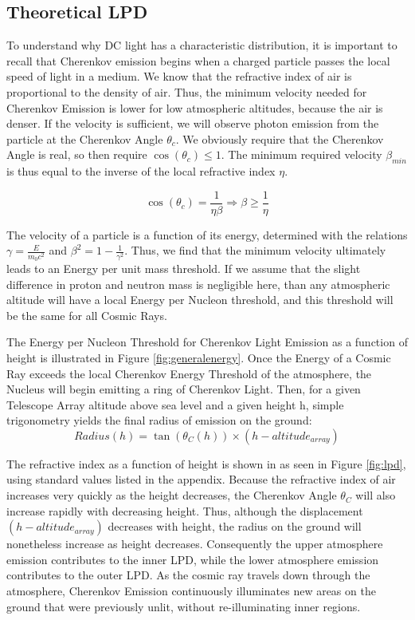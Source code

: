 \documentclass[11pt]{article}
\begin{document}
\subsection{Theoretical LPD}
To understand why DC light has a characteristic distribution, it is important to recall that Cherenkov emission begins when a charged particle passes the local speed of light in a medium.  We know that the refractive index of air is proportional to the density of air. Thus, the minimum velocity needed for Cherenkov Emission is lower for low atmospheric altitudes, because the air is denser. If the velocity is sufficient, we will observe photon emission from the particle at the Cherenkov Angle $\theta_{c}$. We obviously require that the Cherenkov Angle is real, so then require $\cos(\theta_{c}) \leq 1$. The minimum required velocity $\beta_{min}$ is thus equal to the inverse of the local refractive index $\eta$. 

\[ \cos(\theta_{c}) = \frac{1}{\eta \beta}  \Longrightarrow \beta \geq \frac{1}{\eta}\]

The velocity of a particle is a function of its energy, determined with the relations $\gamma = \frac{E}{m_{0} c^{2}}$ and $\beta^{2} = 1 - \frac{1}{\gamma ^{2}}$. Thus, we find that the minimum velocity ultimately leads to an Energy per unit mass threshold. If we assume that the slight difference in proton and neutron mass is negligible here, than any atmospheric altitude will have a local Energy per Nucleon threshold, and this threshold will be the same for all Cosmic Rays. 

The Energy per Nucleon Threshold for Cherenkov Light Emission as a function of height is illustrated in Figure \ref{fig:generalenergy}. Once the Energy of a Cosmic Ray exceeds the local Cherenkov Energy Threshold of the atmosphere, the Nucleus will begin emitting a ring of Cherenkov Light.  Then, for a given Telescope Array altitude above sea level and a given height h, simple trigonometry yields the final radius of emission on the ground:
\[ Radius(h) = \tan (\theta_{C}(h)) \times (h - altitude_{array})\]

The refractive index as a function of height is shown in as seen in Figure \ref{fig:lpd}, using standard values listed in the appendix. Because the refractive index of air increases very quickly as the height decreases, the Cherenkov Angle $\theta_{C}$ will also increase rapidly with decreasing height. Thus, although the displacement $(h - altitude_{array})$ decreases with height, the radius on the ground will nonetheless increase as height decreases. Consequently the upper atmosphere emission contributes to the inner LPD, while the lower atmosphere emission contributes to the outer LPD. As the cosmic ray travels down through the atmosphere, Cherenkov Emission continuously illuminates new areas on the ground that were previously unlit, without re-illuminating inner regions. 
\end{document}
